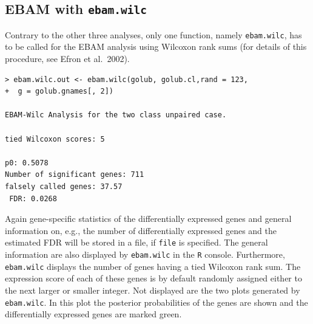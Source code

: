\documentclass[a4paper]{article}
\begin{document}
\subsection{EBAM with \texttt{ebam.wilc}}

Contrary to the other three analyses, only one function, namely
\texttt{ebam.wilc}, has to be called for the EBAM analysis using
Wilcoxon rank sums (for details of this procedure, see Efron et
al.\ 2002).

\begin{verbatim}
> ebam.wilc.out <- ebam.wilc(golub, golub.cl,rand = 123,
+  g = golub.gnames[, 2])

EBAM-Wilc Analysis for the two class unpaired case.

tied Wilcoxon scores: 5

p0: 0.5078
Number of significant genes: 711
falsely called genes: 37.57
 FDR: 0.0268
\end{verbatim}

Again gene-specific statistics of the differentially expressed
genes and general information on, e.g., the number of
differentially expressed genes and the estimated FDR will be
stored in a file, if \texttt{file} is specified. The general
information are also displayed by \texttt{ebam.wilc} in the
\texttt{R} console. Furthermore, \texttt{ebam.wilc} displays the
number of genes having a tied Wilcoxon rank sum. The expression
score of each of these genes is by default randomly assigned
either to the next larger or smaller integer. Not displayed are
the two plots generated by \texttt{ebam.wilc}. In this plot the posterior
probabilities of the genes are shown and the differentially expressed genes are marked
green.

\end{document}
